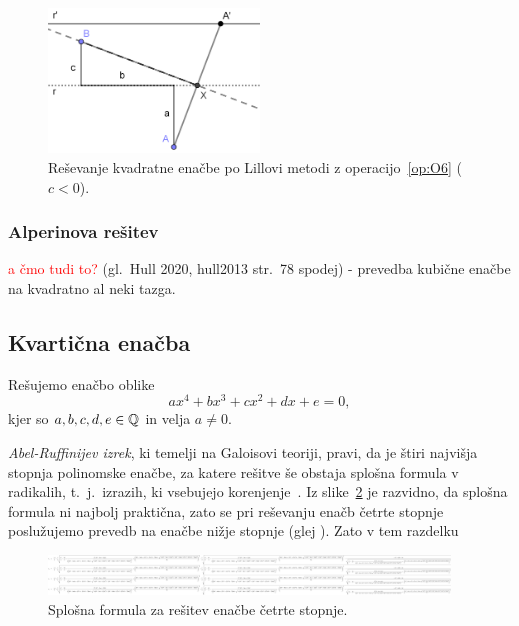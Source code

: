 \begin{figure}[h]
    \centering
    \includegraphics[width=0.5\textwidth]{images/kvadratna_enacba/kvadratna_enacba_lillova_metoda.png}
    \caption[Lillova metoda za kvadratno enačbo]{Reševanje kvadratne enačbe po Lillovi metodi z operacijo~\ref{op:O6} ($c < 0$).}
    \label{fig:kv_en_lill}
\end{figure}

\subsubsection{Alperinova rešitev}

\textcolor{red}{a čmo tudi to?} (gl.\ Hull 2020, hull2013 str.\ 78 spodej) - prevedba kubične enačbe na kvadratno al neki tazga.

\subsection{Kvartična enačba}

Rešujemo enačbo oblike
$$ a x^4 + b x^3 + c x^2 + d x + e = 0, $$
kjer so $a, b, c, d, e \in \mathbb Q$ in velja $a \neq 0$.

\emph{Abel-Ruffinijev izrek}, ki temelji na Galoisovi teoriji, pravi, da je štiri najvišja stopnja polinomske enačbe, za katere rešitve še obstaja splošna formula v radikalih, t.\ j.\ izrazih, ki vsebujejo korenjenje~\cite{mrinal2019}. Iz slike~\ref{fig:kvarticna_formula} je razvidno, da splošna formula ni najbolj praktična, zato se pri reševanju enačb četrte stopnje poslužujemo prevedb na enačbe nižje stopnje (glej ). Zato v tem razdelku 

\begin{figure}[h]
    \centering
    \includegraphics[width=0.95\textwidth]{images/quartic_formula.png}
    \caption[Kvartična formula]{Splošna formula za rešitev enačbe četrte stopnje.}
    \label{fig:kvarticna_formula}
\end{figure}

